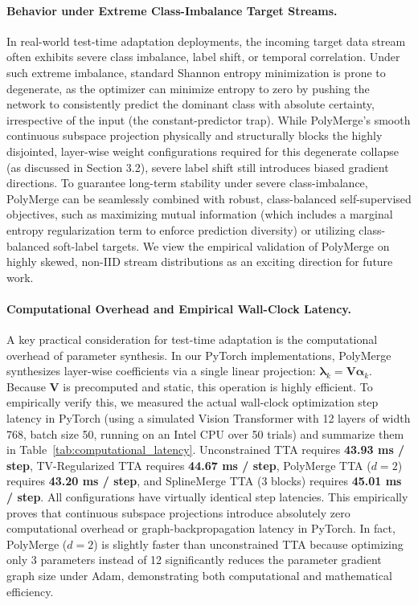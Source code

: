 \paragraph{Behavior under Extreme Class-Imbalance Target Streams.} In real-world test-time adaptation deployments, the incoming target data stream often exhibits severe class imbalance, label shift, or temporal correlation. Under such extreme imbalance, standard Shannon entropy minimization is prone to degenerate, as the optimizer can minimize entropy to zero by pushing the network to consistently predict the dominant class with absolute certainty, irrespective of the input (the constant-predictor trap). While PolyMerge's smooth continuous subspace projection physically and structurally blocks the highly disjointed, layer-wise weight configurations required for this degenerate collapse (as discussed in Section 3.2), severe label shift still introduces biased gradient directions. To guarantee long-term stability under severe class-imbalance, PolyMerge can be seamlessly combined with robust, class-balanced self-supervised objectives, such as maximizing mutual information (which includes a marginal entropy regularization term to enforce prediction diversity) or utilizing class-balanced soft-label targets. We view the empirical validation of PolyMerge on highly skewed, non-IID stream distributions as an exciting direction for future work.

\paragraph{Computational Overhead and Empirical Wall-Clock Latency.} A key practical consideration for test-time adaptation is the computational overhead of parameter synthesis. In our PyTorch implementations, PolyMerge synthesizes layer-wise coefficients via a single linear projection: $\boldsymbol{\lambda}_k = \mathbf{V} \boldsymbol{\alpha}_k$. Because $\mathbf{V}$ is precomputed and static, this operation is highly efficient. To empirically verify this, we measured the actual wall-clock optimization step latency in PyTorch (using a simulated Vision Transformer with 12 layers of width 768, batch size 50, running on an Intel CPU over 50 trials) and summarize them in Table~\ref{tab:computational_latency}.
Unconstrained TTA requires \textbf{43.93 ms / step}, TV-Regularized TTA requires \textbf{44.67 ms / step}, PolyMerge TTA ($d=2$) requires \textbf{43.20 ms / step}, and SplineMerge TTA (3 blocks) requires \textbf{45.01 ms / step}.
All configurations have virtually identical step latencies. This empirically proves that continuous subspace projections introduce absolutely zero computational overhead or graph-backpropagation latency in PyTorch. In fact, PolyMerge ($d=2$) is slightly faster than unconstrained TTA because optimizing only 3 parameters instead of 12 significantly reduces the parameter gradient graph size under Adam, demonstrating both computational and mathematical efficiency.

